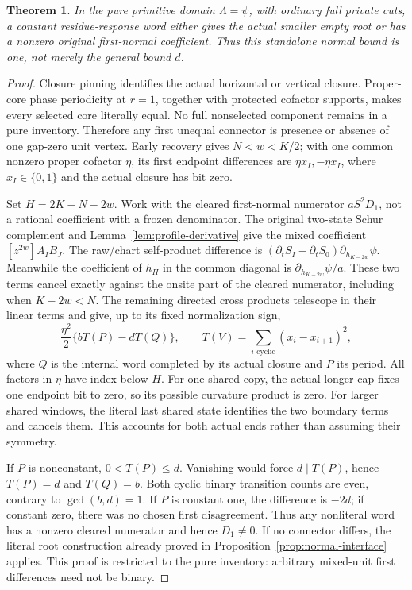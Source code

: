\documentclass[11pt,a4paper]{amsart}
\numberwithin{equation}{section}
\theoremstyle{plain}
\newtheorem{theorem}{Theorem}[section]
\theoremstyle{definition}
\begin{document}
\begin{theorem}\label{thm:pure-primitive-first}
In the pure primitive domain \(\Lambda=\psi\), with ordinary full private cuts, a constant residue-response word either gives the actual smaller empty root or has a nonzero original first-normal coefficient.  Thus this standalone normal bound is one, not merely the general bound \(d\).
\end{theorem}
\begin{proof}
Closure pinning identifies the actual horizontal or vertical closure.  Proper-core phase periodicity at \(r=1\), together with protected cofactor supports, makes every selected core literally equal.  No full nonselected component remains in a pure inventory.  Therefore any first unequal connector is presence or absence of one gap-zero unit vertex.  Early recovery gives \(N<w<K/2\); with one common nonzero proper cofactor \(\eta\), its first endpoint differences are \(\eta x_I,-\eta x_I\), where \(x_I\in\{0,1\}\) and the actual closure has bit zero.

Set \(H=2K-N-2w\).  Work with the cleared first-normal numerator \(aS^2D_1\), not a rational coefficient with a frozen denominator.  The original two-state Schur complement and Lemma~\ref{lem:profile-derivative} give the mixed coefficient \([z^{2w}]A_IB_J\).  The raw/chart self-product difference is \((\partial_tS_I-\partial_tS_0)\partial_{h_{K-2w}}\psi\).  Meanwhile the coefficient of \(h_H\) in the common diagonal is \(\partial_{h_{K-2w}}\psi/a\).  These two terms cancel exactly against the onsite part of the cleared numerator, including when \(K-2w<N\).  The remaining directed cross products telescope in their linear terms and give, up to its fixed normalization sign,
\[
 \frac{\eta^2}{2}\{bT(P)-dT(Q)\},\qquad
 T(V)=\sum_{i\text{ cyclic}}(x_i-x_{i+1})^2,
\]
where \(Q\) is the internal word completed by its actual closure and \(P\) its period.  All factors in \(\eta\) have index below \(H\).  For one shared copy, the actual longer cap fixes one endpoint bit to zero, so its possible curvature product is zero.  For larger shared windows, the literal last shared state identifies the two boundary terms and cancels them.  This accounts for both actual ends rather than assuming their symmetry.

If \(P\) is nonconstant, \(0<T(P)\le d\).  Vanishing would force \(d\mid T(P)\), hence \(T(P)=d\) and \(T(Q)=b\).  Both cyclic binary transition counts are even, contrary to \(\gcd(b,d)=1\).  If \(P\) is constant one, the difference is \(-2d\); if constant zero, there was no chosen first disagreement.  Thus any nonliteral word has a nonzero cleared numerator and hence \(D_1\ne0\).  If no connector differs, the literal root construction already proved in Proposition~\ref{prop:normal-interface} applies.  This proof is restricted to the pure inventory: arbitrary mixed-unit first differences need not be binary.
\end{proof}
\end{document}

